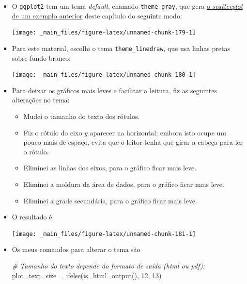\documentclass[
  11pt]{report}
\newenvironment{Shaded}{\begin{snugshade}}{\end{snugshade}}
\newcommand{\CommentTok}[1]{\textcolor[rgb]{0.56,0.35,0.01}{\textit{#1}}}
\newcommand{\DecValTok}[1]{\textcolor[rgb]{0.00,0.00,0.81}{#1}}
\newcommand{\FunctionTok}[1]{\textcolor[rgb]{0.00,0.00,0.00}{#1}}
\newcommand{\NormalTok}[1]{#1}
\newcommand{\OtherTok}[1]{\textcolor[rgb]{0.56,0.35,0.01}{#1}}
\renewenvironment{Shaded}{
    \begin{mdframed}[%
      roundcorner=2pt,%
      innerleftmargin=5pt,%
      innerrightmargin=5pt,%
      topline=true,%
      leftline=true,%
      rightline=true,%
      bottomline=true,%
      linewidth=0.5pt,%
      linecolor=black!20,%
      backgroundcolor=black!2,%
      skipabove=2ex,%
      skipbelow=2.5ex%
    ]%
  }
  {
    \end{mdframed}
  }
\begin{document}
\begin{itemize}
\item
  O \texttt{ggplot2} tem um tema \emph{default}, chamado \texttt{theme\_gray}, que gera \protect\hyperlink{grafico4}{o \emph{scatterplot} de um exemplo anterior} deste capítulo do seguinte modo:

  \begin{center}\texttt{[image: \_main\_files/figure-latex/unnamed-chunk-179-1]} \end{center}
\item
  Para este material, escolhi o tema \texttt{theme\_linedraw}, que usa linhas pretas sobre fundo branco:

  \begin{center}\texttt{[image: \_main\_files/figure-latex/unnamed-chunk-180-1]} \end{center}
\item
  Para deixar os gráficos mais leves e facilitar a leitura, fiz as seguintes alterações no tema:

  \begin{itemize}
  \item
    Mudei o tamanho do texto dos rótulos.
  \item
    Fiz o rótulo do eixo $y$ aparecer na horizontal; embora isto ocupe um pouco mais de espaço, evita que o leitor tenha que girar a cabeça para ler o rótulo.
  \item
    Eliminei as linhas dos eixos, para o gráfico ficar mais leve.
  \item
    Eliminei a moldura da área de dados, para o gráfico ficar mais leve.
  \item
    Eliminei a grade secundária, para o gráfico ficar mais leve.
  \end{itemize}
\item
  O resultado é

  \begin{center}\texttt{[image: \_main\_files/figure-latex/unnamed-chunk-181-1]} \end{center}
\item
  Os meus comandos para alterar o tema são

\begin{Shaded}
\begin{Highlighting}[]
\CommentTok{\# Tamanho do texto depende do formato de saída (html ou pdf):}
\NormalTok{plot\_text\_size }\OtherTok{=} \FunctionTok{ifelse}\NormalTok{(}\FunctionTok{is\_html\_output}\NormalTok{(), }\DecValTok{12}\NormalTok{, }\DecValTok{13}\NormalTok{)}


\end{Highlighting}
\end{Shaded}
\end{itemize}
\end{document}
